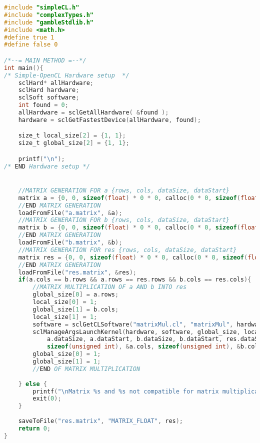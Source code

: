 \begin{lstlisting}[language=C,caption={C-code for matrix multiplication using the GPU, compiled from \gls{gamble} sourcecode.},frame=tlrb]
#include "simpleCL.h"
#include "complexTypes.h"
#include "gambleStdlib.h"
#include <math.h>
#define true 1
#define false 0

/*--= MAIN METHOD =--*/
int main(){
/* Simple-OpenCL Hardware setup  */
	sclHard* allHardware;
	sclHard hardware;
	sclSoft software;
	int found = 0;
	allHardware = sclGetAllHardware( &found );
	hardware = sclGetFastestDevice(allHardware, found);

    size_t local_size[2] = {1, 1};
    size_t global_size[2] = {1, 1};

    printf("\n");
/* END Hardware setup */


    //MATRIX GENERATION FOR a {rows, cols, dataSize, dataStart}
    matrix a = {0, 0, sizeof(float) * 0 * 0, calloc(0 * 0, sizeof(float))};
    //END MATRIX GENERATION
    loadFromFile("a.matrix", &a);
    //MATRIX GENERATION FOR b {rows, cols, dataSize, dataStart}
    matrix b = {0, 0, sizeof(float) * 0 * 0, calloc(0 * 0, sizeof(float))};
    //END MATRIX GENERATION
    loadFromFile("b.matrix", &b);
    //MATRIX GENERATION FOR res {rows, cols, dataSize, dataStart}
    matrix res = {0, 0, sizeof(float) * 0 * 0, calloc(0 * 0, sizeof(float))};
    //END MATRIX GENERATION
    loadFromFile("res.matrix", &res);
    if(a.cols == b.rows && a.rows == res.rows && b.cols == res.cols){
        //MATRIX MULTIPLICATION OF a AND b INTO res
        global_size[0] = a.rows;
        local_size[0] = 1;
        global_size[1] = b.cols;
        local_size[1] = 1;
        software = sclGetCLSoftware("matrixMul.cl", "matrixMul", hardware);
        sclManageArgsLaunchKernel(hardware, software, global_size, local_size, "%r %r %R %a %a",
        	a.dataSize, a.dataStart, b.dataSize, b.dataStart, res.dataSize, res.dataStart,
        	sizeof(unsigned int), &a.cols, sizeof(unsigned int), &b.cols);
        global_size[0] = 1;
        global_size[1] = 1;
        //END OF MATRIX MULTIPLICATION
        
    } else {
        printf("\nMatrix %s and %s not compatible for matrix multiplication into %s \n", "a", "b", "res");
        exit(0);
    }
    
    saveToFile("res.matrix", "MATRIX_FLOAT", res);
    return 0;
}
\end{lstlisting}
